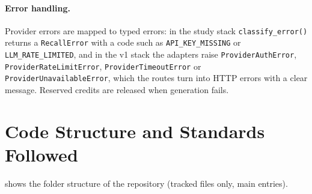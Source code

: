 \paragraph{Error handling.} Provider errors are mapped to typed errors: in the study
stack \texttt{classify\_error()} returns a \texttt{RecallError} with a code such as
\texttt{API\_KEY\_MISSING} or \texttt{LLM\_RATE\_LIMITED}, and in the v1 stack the
adapters raise \texttt{ProviderAuthError}, \texttt{ProviderRateLimitError},
\texttt{ProviderTimeoutError} or \texttt{ProviderUnavailableError}, which the routes turn
into HTTP errors with a clear message. Reserved credits are released when generation
fails.

\section{Code Structure and Standards Followed}\label{sec:code_structure}

 shows the folder structure of the repository (tracked files only, main
entries).

